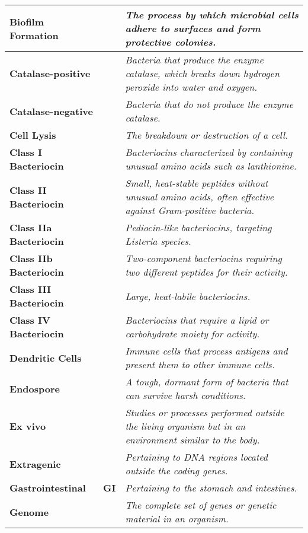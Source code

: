 \begin{longtable}{| p{5cm} | p{2cm} | p{7.5cm} |}
    \hline
    \textbf{Biofilm Formation} &  & \textit{The process by which microbial cells adhere to surfaces and form protective colonies.} \\
    \hline
    \textbf{Catalase-positive} &  & \textit{Bacteria that produce the enzyme catalase, which breaks down hydrogen peroxide into water and oxygen.} \\
    \hline
    \textbf{Catalase-negative} &  & \textit{Bacteria that do not produce the enzyme catalase.} \\
    \hline
    \textbf{Cell Lysis} &  & \textit{The breakdown or destruction of a cell.} \\
    \hline
    \textbf{Class I Bacteriocin} &  & \textit{Bacteriocins characterized by containing unusual amino acids such as lanthionine.} \\
    \hline
    \textbf{Class II Bacteriocin} &  & \textit{Small, heat-stable peptides without unusual amino acids, often effective against Gram-positive bacteria.} \\
    \hline
    \textbf{Class IIa Bacteriocin} &  & \textit{Pediocin-like bacteriocins, targeting \textit{Listeria} species.} \\
    \hline
    \textbf{Class IIb Bacteriocin} &  & \textit{Two-component bacteriocins requiring two different peptides for their activity.} \\
    \hline
    \textbf{Class III Bacteriocin} &  & \textit{Large, heat-labile bacteriocins.} \\
    \hline
    \textbf{Class IV Bacteriocin} &  & \textit{Bacteriocins that require a lipid or carbohydrate moiety for activity.} \\
    \hline
    \textbf{Dendritic Cells} &  & \textit{Immune cells that process antigens and present them to other immune cells.} \\
    \hline
    \textbf{Endospore} &  & \textit{A tough, dormant form of bacteria that can survive harsh conditions.} \\
    \hline
    \textbf{Ex vivo} &  & \textit{Studies or processes performed outside the living organism but in an environment similar to the body.} \\
    \hline
    \textbf{Extragenic} &  & \textit{Pertaining to DNA regions located outside the coding genes.} \\
    \hline
    \textbf{Gastrointestinal} & \textbf{GI} & \textit{Pertaining to the stomach and intestines.} \\
    \hline
    \textbf{Genome} &  & \textit{The complete set of genes or genetic material in an organism.} \\

\end{longtable}

